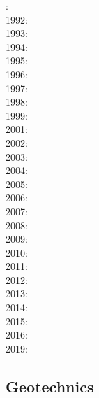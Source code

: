 : \cite{cull60}\\
1992: \cite{befh92}\\
1993: \cite{povp93}\cite{wibf93}\\
1994: \cite{howa94}\cite{koon94}\cite{kobe94}\\
1995: \cite{chmm95}\cite{koon95}\\
1996: \cite{avbu96}\cite{bekh96}\cite{kobe96}\\
1997: \cite{brsa97}\cite{gaft97}\cite{babr97}\\
1998: \cite{deea98}\cite{vabr98}\\
1999: \cite{will99a}\cite{bupi99}\cite{babr99}\cite{tobr99}\\
2001: \cite{zemk01}\cite{tulg01}\cite{brsh01}\cite{bupo01}\cite{coul01}\cite{crda01}\\
2002: \cite{wibr02}\cite{mobr02}\cite{garc02}\cite{whtu02}\\
2003: \cite{brau03}\\
2004: \cite{fijj04}\cite{gocl04}\\
2005: \cite{lave05}\cite{will05}\\
2006: \cite{rosw06}\cite{brau06gsl}\cite{bocr06}\\
2007: \cite{buto07}\cite{sebp07}\cite{tomk07}\\
2008: \cite{alle08}\cite{rowf08}\\
2009: \cite{whip09}\cite{kuhe09}\cite{makh09}\cite{pina09}\cite{dala09}\\
2010: \cite{will10}\cite{tuha10}\cite{brau10b}\cite{brau10}\cite{brya10}\cite{cmwt10}\\
2011: \cite{robr11}\cite{grhd11}\\
2012: \cite{kiwh12}\\
2013: \cite{vehc13}\cite{brwi13}\cite{fihv13a}\cite{fihv13b}\cite{brrs13}\cite{chgz13}\cite{tuva13}
      \cite{caya13} \\
2014: \cite{crbr14}\cite{cokm14}\cite{erhv14}\cite{erhv15} \\
2015: \cite{uewg15}\\
2016: \cite{coyc16}\\
2019: \cite{anpa19}

\subsection*{Geotechnics}

